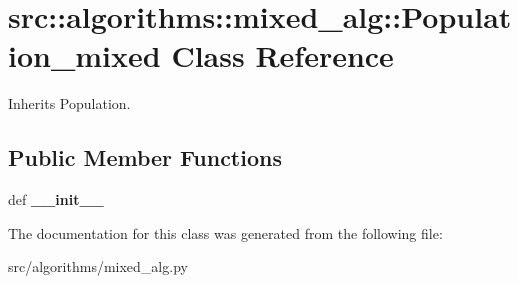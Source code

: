 \hypertarget{classsrc_1_1algorithms_1_1mixed__alg_1_1Population__mixed}{
\section{src::algorithms::mixed\_\-alg::Population\_\-mixed Class Reference}
\label{classsrc_1_1algorithms_1_1mixed__alg_1_1Population__mixed}
}


Inherits Population.

\subsection*{Public Member Functions}
\begin{DoxyCompactItemize}
\item 
\hypertarget{classsrc_1_1algorithms_1_1mixed__alg_1_1Population__mixed_a0ade3b484a00b3d6956d62aac1d4df88}{
def {\bfseries \_\-\_\-init\_\-\_\-}}
\label{classsrc_1_1algorithms_1_1mixed__alg_1_1Population__mixed_a0ade3b484a00b3d6956d62aac1d4df88}

\end{DoxyCompactItemize}


The documentation for this class was generated from the following file:\begin{DoxyCompactItemize}
\item 
src/algorithms/mixed\_\-alg.py\end{DoxyCompactItemize}
